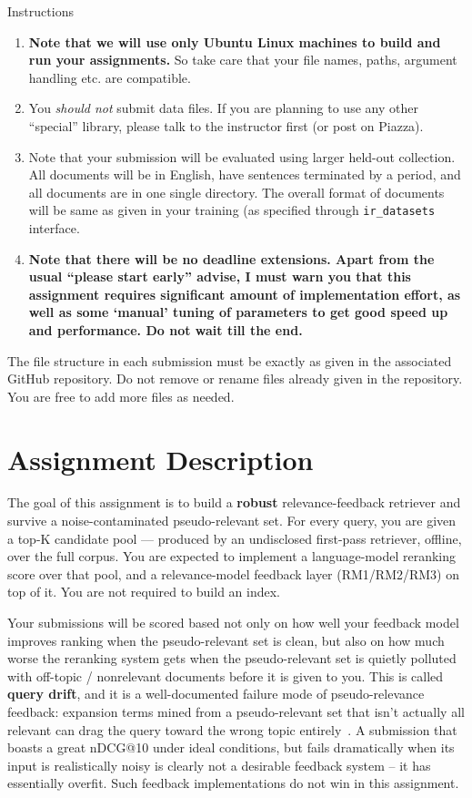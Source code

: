 \documentclass[10pt]{article}
\newcommand{\eat}[1]{}
\begin{document}
\begin{exbox}{Instructions}
{\begin{enumerate}
 \item \textbf{Note that we will use only Ubuntu Linux machines to build and run your assignments.} So take care that your file names, paths, argument handling etc. are compatible.
\item You \emph{should not} submit data files. If you are planning to use any other ``special'' library, please talk to the instructor first (or post on Piazza). 
\item Note that your submission will be evaluated using larger held-out collection.  All documents will be in English, have sentences terminated by a period, \eat{each document is a separate file, }and all documents are in one single directory. The overall format of documents will be same as given in your training (as specified through \texttt{ir\_datasets} interface. 
\item \textbf{Note that there will be no deadline extensions. Apart from the usual ``please start early'' advise, I must warn you that this assignment requires significant amount of implementation effort, as well as some `manual' tuning of parameters to get good speed up and performance. Do not wait till the end.}
\end{enumerate}
}
The file structure in each submission must be exactly as given in the associated GitHub repository. Do not remove or rename files already given in the repository. You are free to add more files as needed. 
\end{exbox}

\section{Assignment Description}

The goal of this assignment is to build a \textbf{robust} relevance-feedback retriever and survive a noise-contaminated pseudo-relevant set. For every query, you are
given a top-K candidate pool — produced by an undisclosed first-pass retriever,
offline, over the full corpus. You are expected to implement a language-model reranking score over that pool, and a relevance-model feedback layer (RM1/RM2/RM3) on top of it. 
You are not required to build an index. 

Your submissions will be scored based not only on how well your feedback model improves ranking when the pseudo-relevant set is clean, but also on how much worse the reranking system gets when the pseudo-relevant set is quietly polluted with off-topic / nonrelevant documents before it is given to you. This is called \textbf{query drift}, and it is a well-documented failure mode of pseudo-relevance feedback: expansion terms mined from a pseudo-relevant set that isn't actually all relevant can drag the query toward the wrong topic entirely~\cite{mitra1998}. A submission that boasts a great nDCG@10 under ideal conditions, but fails dramatically when its input is realistically noisy is clearly not a desirable feedback system -- it has essentially overfit. Such feedback implementations do not win in this assignment. 
\end{document}
